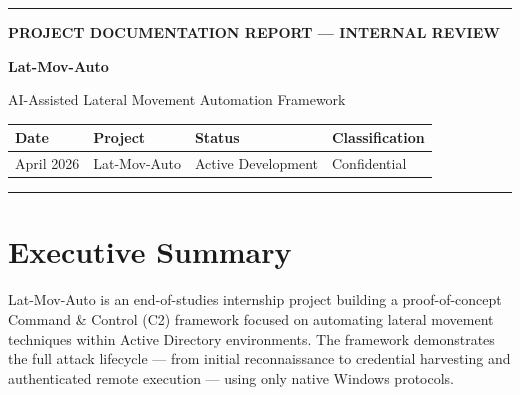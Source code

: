 \documentclass[11pt,a4paper]{article}
\begin{document}
\thispagestyle{empty}

\vspace*{3cm}

{\color{accent}\rule{\linewidth}{3pt}}

\vspace{0.4cm}

{\small\bfseries\color{accent}\MakeUppercase{Project Documentation Report --- Internal Review}}

\vspace{0.3cm}

{\Huge\bfseries\color{dark} Lat-Mov-Auto}

\vspace{0.2cm}

{\Large\color{mid} AI-Assisted Lateral Movement Automation Framework}

\vspace{0.8cm}

\begin{tabularx}{\linewidth}{|X|X|X|X|}
\hline
\cellcolor{bgsoft}\small\textbf{\color{dark}Date} &
\cellcolor{bgsoft}\small\textbf{\color{dark}Project} &
\cellcolor{bgsoft}\small\textbf{\color{dark}Status} &
\cellcolor{bgsoft}\small\textbf{\color{dark}Classification} \\
\hline
\cellcolor{bgsoft}\small April 2026 &
\cellcolor{bgsoft}\small Lat-Mov-Auto &
\cellcolor{bgsoft}\small Active Development &
\cellcolor{bgsoft}\small Confidential \\
\hline
\end{tabularx}

\vspace{0.3cm}
{\color{borderclr}\rule{\linewidth}{0.5pt}}

\newpage

\section{Executive Summary}

\begin{tcolorbox}[infobox]
Lat-Mov-Auto is an end-of-studies internship project building a proof-of-concept Command \& Control (C2) framework focused on automating lateral movement techniques within Active Directory environments. The framework demonstrates the full attack lifecycle --- from initial reconnaissance to credential harvesting and authenticated remote execution --- using only native Windows protocols.
\end{tcolorbox}
\end{document}
